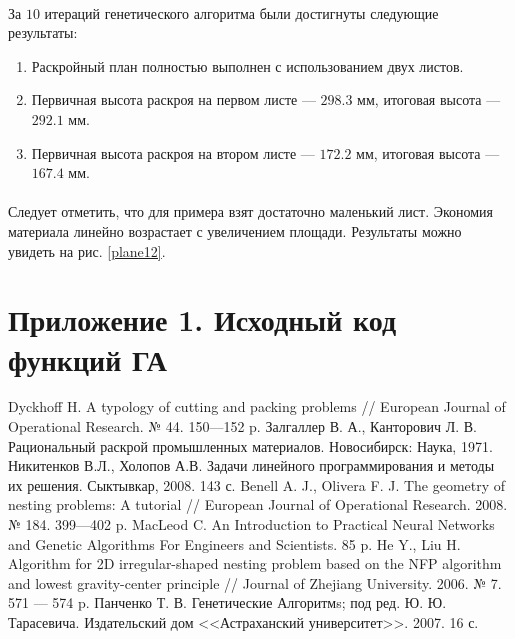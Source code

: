 \documentclass[14pt]{extarticle}
\begin{document}
	\paragraph{}
	За $10$ итераций генетического алгоритма были достигнуты следующие результаты:
	\begin{enumerate}
		\item Раскройный план полностью выполнен с использованием двух листов.
		\item Первичная высота раскроя на первом листе --- $298.3$ мм, итоговая высота --- $292.1$ мм.
		\item Первичная высота раскроя на втором листе --- $172.2$ мм, итоговая высота --- $167.4$ мм.
	\end{enumerate}
	\paragraph{}
	Следует отметить, что для примера взят достаточно маленький лист. Экономия материала линейно возрастает с увеличением площади. Результаты можно увидеть на рис. \ref{plane12}.
	\newpage
	\section*{Приложение 1. Исходный код функций ГА}
	
	\newpage
	\begin{thebibliography}{1}
		 Dyckhoff H. A typology of cutting and packing problems // European Journal of Operational Research. № 44. 150---152 p.
		 Залгаллер В. А., Канторович Л. В. Рациональный раскрой промышленных материалов. Новосибирск: Наука, 1971.
		 Никитенков В.Л., Холопов А.В. Задачи линейного программирования и методы их решения. Сыктывкар, 2008. 143 с.
		 Benell A. J., Olivera F. J. The geometry of nesting problems: A tutorial // European Journal of Operational Research. 2008. № 184. 399---402 p.
		 MacLeod C. An Introduction to Practical Neural Networks and Genetic Algorithms For Engineers and Scientists. 85 p.
		 He Y., Liu H. Algorithm for 2D irregular-shaped nesting problem based on the NFP algorithm and lowest gravity-center principle // Journal of Zhejiang University. 2006. № 7. 571 --- 574 p.
		 Панченко Т. В. Генетические Алгоритмs; под ред. Ю. Ю. Тарасевича. Издательский дом <<Астраханский университет>>. 2007. 16 с.
	\end{thebibliography}
\end{document}
